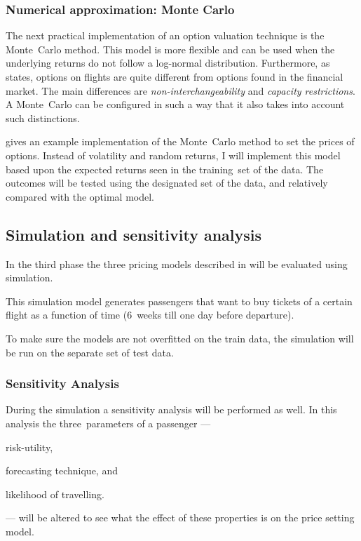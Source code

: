 \subsubsection{Numerical approximation: Monte Carlo}
The next practical implementation of an option valuation technique is the Monte~Carlo method. This model is more flexible and can be used when the underlying returns do not follow a log-normal distribution. Furthermore, as  states, options on flights are quite different from options found in the financial market. The main differences are \emph{non-interchangeability} and \emph{capacity restrictions}. A Monte~Carlo can be configured in such a way that it also takes into account such distinctions.

 gives an example implementation of the Monte~Carlo method to set the prices of options. Instead of volatility and random returns, I will implement this model based upon the expected returns seen in the training~set of the data. The outcomes will be tested using the designated set of the data, and relatively compared with the optimal model.


\subsection{Simulation and sensitivity analysis}
\label{subsec:SimulationAndSensitivityAnalysis}
In the third phase the three pricing models described in  will be evaluated using simulation.

This simulation model generates passengers that want to buy tickets of a certain flight as a function of time (6~weeks till one day before departure). 

To make sure the models are not overfitted on the train data, the simulation will be run on the separate set of test data.

\subsubsection{Sensitivity Analysis}
During the simulation a sensitivity analysis will be performed as well. In this analysis the three~parameters of a passenger --- \begin{inparaenum}
\item risk-utility,
\item forecasting technique, and
\item likelihood of travelling.
\end{inparaenum} --- will be altered to see what the effect of these properties is on the price setting model.
